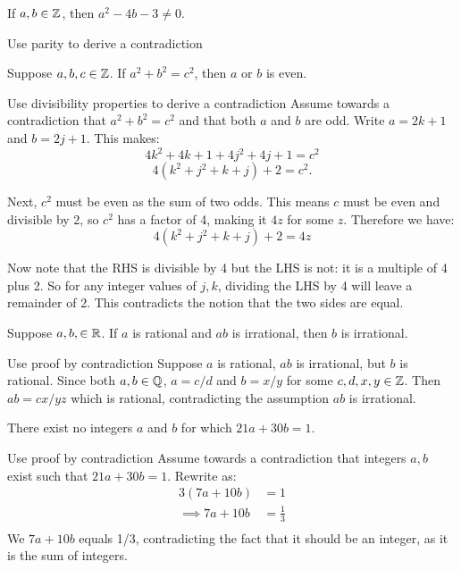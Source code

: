 \documentclass{article}
\begin{document}
\begin{problem}
If $a, b \in \mathbb{Z}$, then $a^2 - 4b - 3 \neq 0$.
\end{problem}
\begin{solution}{Use parity to derive a contradiction}


\end{solution}

\begin{problem}
Suppose $a, b, c \in \mathbb{Z}$. If $a^2 + b^2 = c^2$, then $a$ or $b$ is even.
\end{problem}
\begin{solution}{Use divisibility properties to derive a contradiction}
  Assume towards a contradiction that $a^2 + b^2 = c^2$ and that both $a$ and $b$ are odd. Write $a = 2k + 1$ and $b = 2j + 1$. This makes:
  $$4k^2 + 4k + 1 + 4j^2 + 4j + 1 = c^2$$
  $$4(k^2 + j^2 + k + j) + 2 = c^2.$$

  Next, $c^2$ must be even as the sum of two odds. This means $c$ must be even and divisible by 2, so $c^2$ has a factor of 4, making it $4z$ for some $z$. Therefore we have:
  $$4(k^2 + j^2 + k + j) + 2 = 4z$$

  Now note that the RHS is divisible by 4 but the LHS is not: it is a multiple of 4 plus 2. So for any integer values of $j, k$, dividing the LHS by 4 will leave a remainder of 2. This contradicts the notion that the two sides are equal.
\end{solution}

\begin{problem}
Suppose $a, b, \in \mathbb{R}$. If $a$ is rational and $ab$ is irrational, then $b$ is irrational.
\end{problem}
\begin{solution}{Use proof by contradiction}
  Suppose $a$ is rational, $ab$ is irrational, but $b$ is rational. Since both $a, b \in \mathbb{Q}$, $a = c/d$ and $b = x/y$ for some $c, d, x, y \in \mathbb{Z}$. Then $ab = cx/yz$ which is rational, contradicting the assumption $ab$ is irrational.
\end{solution}

\begin{problem}
There exist no integers $a$ and $b$ for which $21a + 30b = 1$.
\end{problem}
\begin{solution}{Use proof by contradiction}
  Assume towards a contradiction that integers $a, b$ exist such that $21a + 30b = 1$. Rewrite as:
  \begin{align*}
    3(7a + 10b)       & = 1           \\
    \implies 7a + 10b & = \frac{1}{3} \\
  \end{align*}
  We $7a + 10b$  equals 1/3, contradicting the fact that it should be an integer, as it is the sum of integers.
\end{solution}
\end{document}
